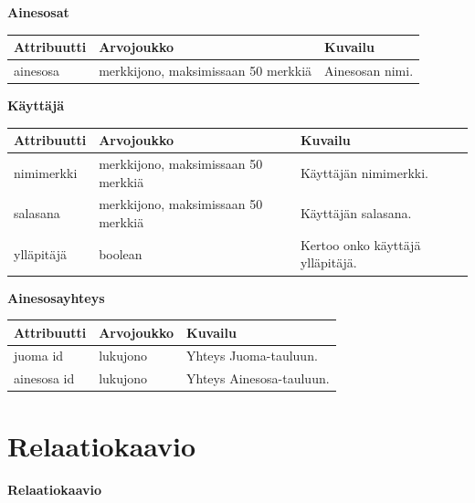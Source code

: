 \documentclass[a4paper]{article}
\begin{document}
\begin{flushleft}\textbf{Ainesosat} \end{flushleft}
\begin{flushleft}
	\begin{tabular}{|l|l|l|}
			\hline
			Attribuutti & Arvojoukko & Kuvailu \\ 
			\hline
			ainesosa & merkkijono, maksimissaan 50 merkkiä & Ainesosan nimi. \\ 
			\hline
	\end{tabular}
\end{flushleft}

\begin{flushleft}\textbf{Käyttäjä} \end{flushleft}
\begin{flushleft}
	\begin{tabular}{|l|l|l|}
			\hline
			Attribuutti & Arvojoukko & Kuvailu   \\ 
			\hline
			nimimerkki  & merkkijono, maksimissaan 50 merkkiä & Käyttäjän nimimerkki. \\ 
			\hline
			salasana    & merkkijono, maksimissaan 50 merkkiä & Käyttäjän salasana.   \\ 
			\hline
			ylläpitäjä    & boolean & Kertoo onko käyttäjä ylläpitäjä.   \\
			\hline
	\end{tabular}
\end{flushleft}

\begin{flushleft}\textbf{Ainesosayhteys} \end{flushleft}
\begin{flushleft}
	\begin{tabular}{|l|l|l|}
			\hline
			Attribuutti & Arvojoukko & Kuvailu   \\ 
			\hline
			juoma id  & lukujono & Yhteys Juoma-tauluun. \\ 
			\hline
			ainesosa id    & lukujono & Yhteys Ainesosa-tauluun.  \\ 
			\hline
	\end{tabular}
\end{flushleft}

\section{Relaatiokaavio}
\begin{flushleft}\textbf{Relaatiokaavio} \end{flushleft}
\end{document}
